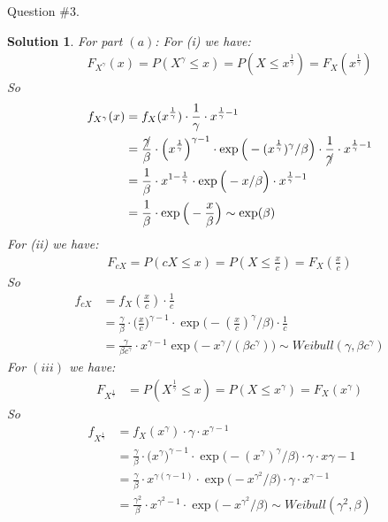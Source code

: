 \documentclass[11pt]{article}
\newtheorem{sol}{Solution}
\begin{document}
Question $\#3$.
\begin{sol}
	For part $(a)$:\vskip 2mm
	For (i) we have:
	\begin{align*}
		F_{X^{\gamma}}(x)= P(X^{\gamma} \leq x) = P(X \leq x^{\frac{1}{\gamma}})= F_X(x^{\frac{1}{\gamma}})
	\end{align*}
	So
	\begin{align*}
		f_{X^{\gamma}}(x) &= f_{X}(x^{\frac{1}{\gamma}})\cdot \frac{1}{\gamma}\cdot x^{\frac{1}{\gamma} - 1}\\
		&= \frac{\cancel{\gamma}}{\beta}\cdot \Big(x^{\frac{1}{\gamma}}\Big)^{\gamma - 1}\cdot \exp\Big(-(x^{\frac{1}{\gamma}})^{\gamma}/\beta\Big)\cdot \frac{1}{\cancel{\gamma}}\cdot x^{\frac{1}{\gamma} - 1}\\
		&= \frac{1}{\beta}\cdot x^{1 - \frac{1}{\gamma}}\cdot \exp\Big(-x/\beta\Big)\cdot x^{\frac{1}{\gamma} - 1}\\
		&= \frac{1}{\beta}\cdot \exp\Big(-\frac{x}{\beta}\Big) \sim \exp(\beta)
	\end{align*}
	For (ii) we have:
	\begin{align*}
		F_{cX} = P(c X \leq x) = P(X \leq \frac{x}{c}) = F_X(\frac{x}{c})
	\end{align*}
	So
	\begin{align*}
		f_{cX} &= f_X(\frac{x}{c})\cdot \frac{1}{c}\\
		&= \frac{\gamma}{\beta}\cdot \Big(\frac{x}{c}\Big)^{\gamma - 1}\cdot \exp\Big(-(\frac{x}{c})^{\gamma}/\beta\Big)\cdot \frac{1}{c}\\
		&= \frac{\gamma }{\beta  c^{\gamma}}\cdot x^{\gamma - 1}\exp\Big(-x^{\gamma}/(\beta c^{\gamma})\Big) \sim Weibull(\gamma, \beta c^{\gamma})
	\end{align*}
	For $(iii)$ we have:
	\begin{align*}
		F_{X^{\frac{1}{\gamma}}} &= P(X^{\frac{1}{\gamma}} \leq x) = P(X \leq x^{\gamma}) = F_X(x^{\gamma})
	\end{align*}
	So
	\begin{align*}
		f_{X^{\frac{1}{\gamma}}} &= f_X(x^{\gamma})\cdot \gamma \cdot x^{\gamma - 1}\\
		&= \frac{\gamma}{\beta}\cdot \Big(x^{\gamma}\Big)^{\gamma - 1}\cdot \exp\Big(-(x^{\gamma})^{\gamma}/\beta\Big)\cdot \gamma \cdot x{\gamma - 1}\\
		&= \frac{\gamma}{\beta}\cdot x^{\gamma(\gamma - 1)}\cdot \exp\Big(-x^{\gamma^2}/\beta\Big)\cdot \gamma \cdot x^{\gamma - 1}\\
		&= \frac{\gamma^2}{\beta}\cdot x^{\gamma^2 - 1}\cdot \exp\Big(-x^{\gamma^2}/\beta\Big) \sim Weibull(\gamma^2, \beta)

\end{align*}
\end{sol}
\end{document}
